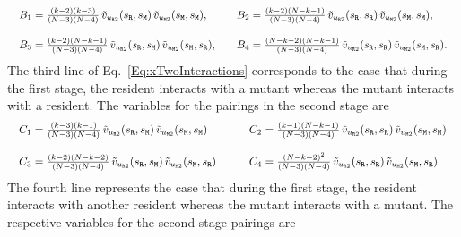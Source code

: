\documentclass[11pt]{article}
\def\resident{\texttt{R}}
\def\mutant{\texttt{M}}
\def\strategy{s}
\theoremstyle{plainCl1}
\theoremstyle{plainCl2}
\begin{document}
\begin{equation*}
  \setlength{\arraycolsep}{10pt}
  \begin{array}{ll}
   B_1  = \frac{(k - 2) (k - 3)}{(N - 3) (N - 4)}\, \tilde{v}_{u_{\resident 2}}(\strategy_\resident,\strategy_\mutant) \,\tilde{v}_{u_{\mutant 2}}(\strategy_\mutant,\strategy_\mutant),
   &B_2 = \frac{\left(k - 2\right) \left(N - k - 1\right)}{(N - 3) (N - 4)}\, \tilde{v}_{u_{\resident 2}}(\strategy_\resident,\strategy_\resident) \,\tilde{v}_{u_{\mutant 2}}(\strategy_\mutant,\strategy_\mutant), \\[0.5cm] 
   B_3  = \frac{\left(k - 2\right) \left(N - k - 1\right)}{(N - 3) (N - 4)}\, \tilde{v}_{u_{\resident 2}}(\strategy_\resident,\strategy_\mutant) \,\tilde{v}_{u_{\mutant 2}}(\strategy_\mutant,\strategy_\resident),
   &B_4 = \frac{\left(N - k - 2\right) \left(N - k - 1\right)}{(N - 3) (N - 4)}\, \tilde{v}_{u_{\resident 2}}(\strategy_\resident,\strategy_\resident) \, \tilde{v}_{u_{\mutant 2}}(\strategy_\mutant,\strategy_\resident).
   \end{array}
\end{equation*}
 The third line of Eq.~\eqref{Eq:xTwoInteractions} corresponds to the case that during the first stage, the resident interacts with a mutant whereas the mutant interacts with a resident. The variables for the pairings in the second stage are
\begin{equation*}
  \setlength{\arraycolsep}{10pt}
  \begin{array}{llrl}
   C_1  = \frac{\left(k - 3\right) \left(k - 1\right)}{(N - 3) (N - 4)} \, \tilde{v}_{u_{\resident 2}}(\strategy_\resident,\strategy_\mutant) \, \tilde{v}_{u_{\mutant 2}}(\strategy_\mutant,\strategy_\mutant) \quad
   &C_2 = \frac{\left(k - 1\right) \left(N - k - 1\right)}{(N - 3) (N - 4)} \, \tilde{v}_{u_{\resident 2}}(\strategy_\resident,\strategy_\resident) \, \tilde{v}_{u_{\mutant 2}}(\strategy_\mutant,\strategy_\mutant) \\[0.5cm] 
   C_3  = \frac{\left(k - 2\right) \left(N - k - 2\right)}{(N - 3) (N - 4)} \, \tilde{v}_{u_{\resident 2}}(\strategy_\resident,\strategy_\mutant) \, \tilde{v}_{u_{\mutant 2}}(\strategy_\mutant,\strategy_\resident) \quad
   &C_4 = \frac{\left(N - k - 2\right)^{2}}{(N - 3) (N - 4)} \, \tilde{v}_{u_{\resident 2}}(\strategy_\resident,\strategy_\resident) \, \tilde{v}_{u_{\mutant 2}}(\strategy_\mutant,\strategy_\resident) 
   \end{array}
   \end{equation*}
The fourth line represents the case that during the first stage, the resident interacts with another resident whereas the mutant interacts with a mutant. The respective variables for the second-stage pairings are
\end{document}
